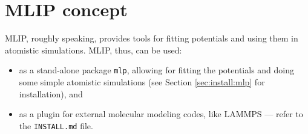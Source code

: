 \documentclass[12pt]{article}
\renewcommand{\_}{\char`_}
\begin{document}
\section{MLIP concept} \label{sec:concept}

MLIP, roughly speaking, provides tools for fitting potentials and using them in atomistic simulations.
MLIP, thus, can be used:
\begin{itemize}
\item
as a stand-alone package \texttt{mlp}, allowing for fitting the potentials and doing some simple atomistic simulations (see Section \ref{sec:install:mlp} for installation), and

\item as a plugin for external molecular modeling codes, like LAMMPS --- refer to the \texttt{INSTALL.md} file.
\end{itemize}
\end{document}
